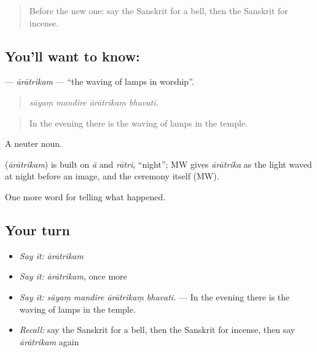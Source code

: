 \begin{quote}
Before the new one: say the Sanskrit for a bell, then the Sanskrit for incense.
\end{quote}

\subsection*{You'll want to know: }
\textbf{} — \emph{ārātrikam} — \textquotedblleft{}the waving of lamps in worship\textquotedblright{}.

\begin{quote}
   
\end{quote}

\begin{quote}
\emph{sāyaṃ mandire ārātrikaṃ bhavati.}
\end{quote}

\begin{quote}
In the evening there is the waving of lamps in the temple.
\end{quote}

A neuter noun.

\begin{cousinweb}
\textbf{} (\emph{ārātrikam}) is built on \emph{ā} and \emph{rātri}, \textquotedblleft{}night\textquotedblright{}; MW gives \emph{ārātrika} as the light waved at night before an image, and the ceremony itself (MW).
\end{cousinweb}

\begin{grammarlens}[title={What you've built}]
One more word for telling what happened.
\end{grammarlens}

\subsection*{Your turn}
\begin{itemize}
\raggedright
  \item \emph{Say it:} \emph{ārātrikam}
  \item \emph{Say it:} \emph{ārātrikam}, once more
  \item \emph{Say it:} \emph{sāyaṃ mandire ārātrikaṃ bhavati.} — In the evening there is the waving of lamps in the temple.
  \item \emph{Recall:} say the Sanskrit for a bell, then the Sanskrit for incense, then say \emph{ārātrikam} again
\end{itemize}

